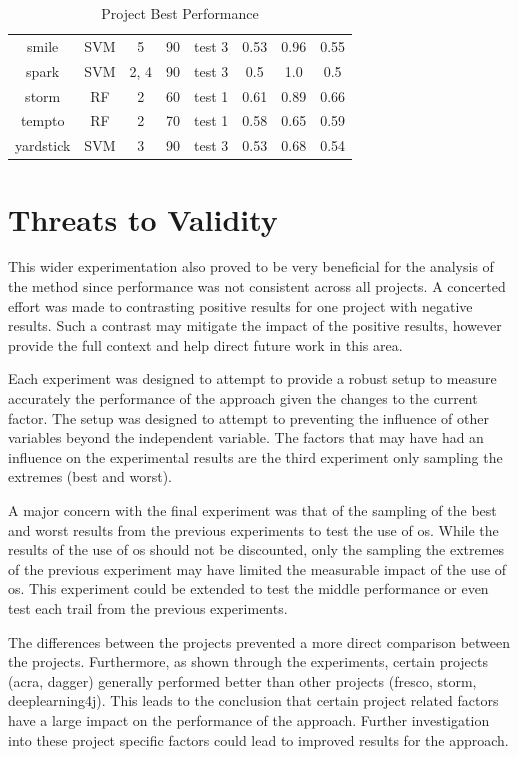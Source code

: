 \begin{table}
\begin{center}
\begin{tabular}{|c|c|c|c|c|c|c|c|}
        smile & SVM & 5 & 90 & test 3 & 0.53 & 0.96 & 0.55 \\
        spark & SVM & 2, 4 & 90 & test 3 & 0.5 & 1.0 & 0.5 \\
        storm & RF & 2 & 60 & test 1 & 0.61 & 0.89 & 0.66 \\
        tempto & RF & 2 & 70 & test 1 & 0.58 & 0.65 & 0.59 \\
        yardstick & SVM & 3 & 90 & test 3 & 0.53 & 0.68 & 0.54 \\
        \hline
    \end{tabular}
\end{center}
\caption{Project Best Performance}
\label{tab:project_performance}
\end{table}

\clearpage
\section{Threats to Validity}
\label{sec:threat_validity}

This wider experimentation also proved to be very beneficial for the analysis of the method since performance was not consistent across all projects. A concerted effort was made to contrasting positive results for one project with negative results. Such a contrast may mitigate the impact of the positive results, however provide the full context and help direct future work in this area.

Each experiment was designed to attempt to provide a robust setup to measure accurately the performance of the approach given the changes to the current factor. The setup was designed to attempt to preventing the influence of other variables beyond the independent variable. The factors that may have had an influence on the experimental results are the third experiment only sampling the extremes (best and worst).

A major concern with the final experiment was that of the sampling of the best and worst results from the previous experiments to test the use of \gls{os}. While the results of the use of \gls{os} should not be discounted, only the sampling the extremes of the previous experiment may have limited the measurable impact of the use of \gls{os}. This experiment could be extended to test the middle performance or even test each trail from the previous experiments.

The differences between the projects prevented a more direct comparison between the projects. Furthermore, as shown through the experiments, certain projects (acra, dagger) generally performed better than other projects (fresco, storm, deeplearning4j). This leads to the conclusion that certain project related factors have a large impact on the performance of the approach. Further investigation into these project specific factors could lead to improved results for the approach.